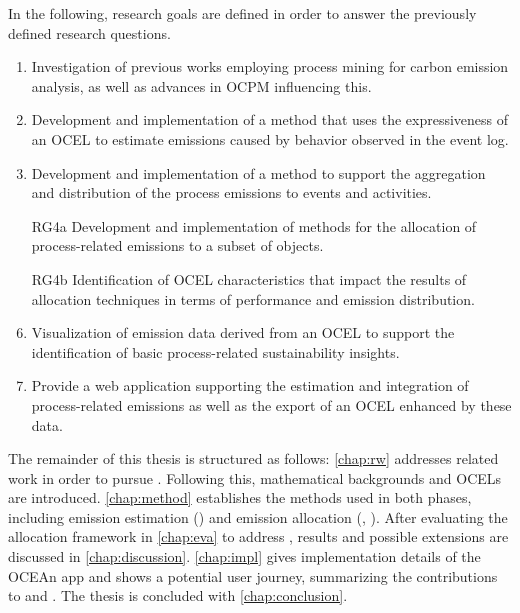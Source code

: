 In the following, research goals are defined in order to answer the previously defined research questions.

\begin{enumerate}[label={RG\arabic*},ref={RG\arabic*},leftmargin=1.25cm,labelwidth=1cm,align=left]
	\item\label{rg:1-rw}
	Investigation of previous works employing process mining for carbon emission analysis, as well as advances in OCPM influencing this.
	\item\label{rg:2-est}
	Development and implementation of a method that uses the expressiveness of an OCEL to estimate emissions caused by behavior observed in the event log.
	\item\label{rg:3-events}
	Development and implementation of a method to support the aggregation and distribution of the process emissions to events and activities.
	\item[RG4a]\label{rg:4a-obj-framework}
	Development and implementation of methods for the allocation of process-related emissions to a subset of objects.
	\item[RG4b]\label{rg:4b-obj-eva}
	Identification of OCEL characteristics that impact the results of allocation techniques in terms of performance and emission distribution.
	\setcounter{enumi}{4}
	\item\label{rg:5-viz} Visualization of emission data derived from an OCEL to support the identification of basic process-related sustainability insights.
	\item\label{rg:6-ocean-export} Provide a web application supporting the estimation and integration of process-related emissions as well as the export of an OCEL enhanced by these data.
\end{enumerate}

The remainder of this thesis is structured as follows:
\autoref{chap:rw} addresses related work in order to pursue \RGone.
Following this, mathematical backgrounds and OCELs are introduced.
\autoref{chap:method} establishes the methods used in both phases,
including emission estimation (\RGtwo){} and emission allocation (\RGthree, \RGfourA).
After evaluating the allocation framework in \autoref{chap:eva} to address \RGfourB,
results and possible extensions are discussed in \autoref{chap:discussion}.
\autoref{chap:impl} gives implementation details of the OCEAn app and shows a potential user journey, summarizing the contributions to \RGfive{} and \RGsix.
The thesis is concluded with \autoref{chap:conclusion}.
